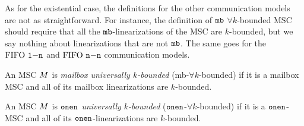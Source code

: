 As for the existential case, the definitions for the other communication models are not as straightforward. For instance, the definition of $\mathtt{mb}$ $\forall k$-bounded MSC should require that all the $\mathtt{mb}$-linearizations of the MSC are $k$-bounded, but we say nothing about linearizations that are not $\mathtt{mb}$. The same goes for the $\text{FIFO } \mathtt{1\mathsf{-}n}$ and $\text{FIFO } \mathtt{n\mathsf{-}n}$ communication models.

\begin{definition}
	An MSC $M$ is \emph{mailbox universally $k$-bounded} (mb-$\forall k$-bounded) if it is a mailbox MSC and all of its mailbox linearizations are $k$-bounded.
\end{definition}
\begin{definition}
	An MSC $M$ is \emph{$\mathtt{onen}$ universally $k$-bounded} ($\mathtt{onen}$-$\forall k$-bounded) if it is a $\mathtt{onen}$-MSC and all of its $\mathtt{onen}$-linearizations are $k$-bounded.
\end{definition}




